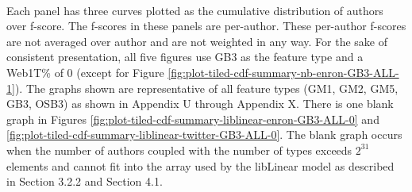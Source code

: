 	\paragraph*{}Each panel has three curves plotted as the cumulative distribution of authors over f-score.  The f-scores in these panels are per-author. These per-author f-scores are not averaged over author and are not weighted in any way.  For the sake of consistent presentation, all five figures use GB3 as the feature type and a Web1T\% of 0 (except for Figure \ref{fig:plot-tiled-cdf-summary-nb-enron-GB3-ALL-1}).  The graphs shown are representative of all feature types (GM1, GM2, GM5, GB3, OSB3) as shown in Appendix U through Appendix X. There is one blank graph in Figures \ref{fig:plot-tiled-cdf-summary-liblinear-enron-GB3-ALL-0} and \ref{fig:plot-tiled-cdf-summary-liblinear-twitter-GB3-ALL-0}.  The blank graph occurs when the number of authors coupled with the number of types exceeds $2^{31}$ elements and cannot fit into the array used by the libLinear model as described in Section 3.2.2 and Section 4.1.
	
\begin{comment}
	\paragraph*{} The characteristics being examined in these cumulative distribution graphs are: the curvature within the graph, how closely the curves are grouped, and the left/right position of the curves.  
	\begin{itemize}
		\item For curvature, down and right curvature shows that a larger number of authors have higher f-scores. down and right curvature means better classifier performance. Up and left curvature shows that a larger number of authors have lower f-scores.  Up and left curvature indicates poorer classifier performance.
		\item For close grouping of curves, more closely grouped curves indicate a smaller author prolificity effect on f-score.  For instance, if the small-to-large curve, representing similarly prolific authors, has down and right curvature while the small-and-large curve, representing similarly prolific authors, has up and left curvature, there is a clear indication that author prolificity affects the classifier.  More closely grouped curves demonstrate more consistent classifier performance.
		\item In examining the left/right position of curves, curves positioned further to the right indicate more authors with a higher f-score. For instance, a line starting with an f-score of 0.0 shows that at least one author had a f-score of 0.0.  A line starting at 0.4 shows the worst f-score for any author was 0.4.  Curves with positions further to the right demonstrate a better performing method-feature combination.	
	\end{itemize}
\end{comment}

